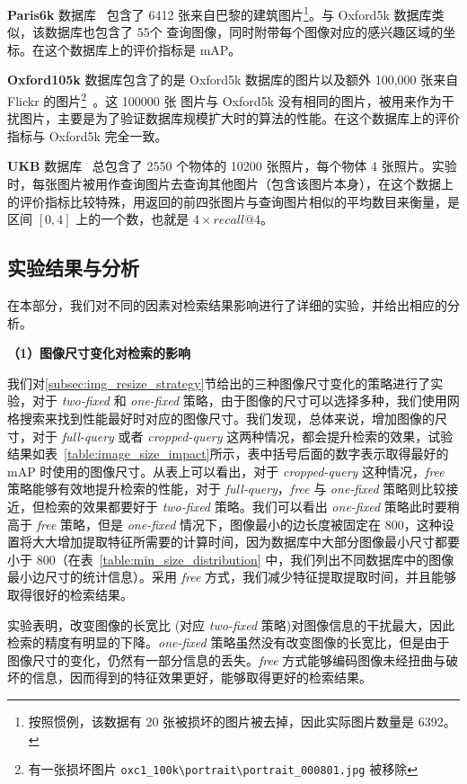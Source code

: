 \textbf{Paris6k} 数据库~\cite{Philbin2008LostIQ} 包含了 6412 张来自巴黎的建筑图片\footnote{按照惯例，该数据有 20 张被损坏的图片被去掉，因此实际图片数量是 6392。}。与 Oxford5k 数据库类似，该数据库也包含了 55个 查询图像，同时附带每个图像对应的感兴趣区域的坐标。在这个数据库上的评价指标是 mAP。

\textbf{Oxford105k} 数据库包含了的是 Oxford5k 数据库的图片以及额外 100,000 张来自 Flickr 的图片\footnote{有一张损坏图片 \verb+oxc1_100k\portrait\portrait_000801.jpg+ 被移除}~\cite{Philbin2007ObjectRW}。这 100000 张
图片与 Oxford5k 没有相同的图片，被用来作为干扰图片，主要是为了验证数据库规模扩大时的算法的性能。在这个数据库上的评价指标与 Oxford5k 完全一致。

\textbf{UKB} 数据库~\cite{Nistr2006ScalableRW} 总包含了 2550 个物体的 10200 张照片，每个物体 4 张照片。实验时，每张图片被用作查询图片去查询其他图片（包含该图片本身），在这个数据上的评价指标比较特殊，用返回的前四张图片与查询图片相似的平均数目来衡量，是区间 $[0,4]$ 上的一个数，也就是 $4\times recall@4$。

\subsection{实验结果与分析}
在本部分，我们对不同的因素对检索结果影响进行了详细的实验，并给出相应的分析。


\noindent\textbf{（1）图像尺寸变化对检索的影响}

我们对\ref{subsec:img_resize_strategy}节给出的三种图像尺寸变化的策略进行了实验，对于 \emph{two-fixed} 和
\emph{one-fixed} 策略，由于图像的尺寸可以选择多种，我们使用网格搜索来找到性能最好时对应的图像尺寸。我们发现，总体来说，增加图像的尺寸，对于 \emph{full-query} 或者 \emph{cropped-query} 这两种情况，都会提升检索的效果，试验结果如表~\ref{table:image_size_impact}所示，表中括号后面的数字表示取得最好的 mAP 时使用的图像尺寸。从表上可以看出，对于 \emph{cropped-query} 这种情况，\emph{free} 策略能够有效地提升检索的性能，对于 \emph{full-query}，\emph{free} 与 \emph{one-fixed} 策略则比较接近，但检索的效果都要好于 \emph{two-fixed} 策略。我们可以看出 \emph{one-fixed} 策略此时要稍高于 \emph{free} 策略，但是 \emph{one-fixed} 情况下，图像最小的边长度被固定在 800，这种设置将大大增加提取特征所需要的计算时间，因为数据库中大部分图像最小尺寸都要小于 800（在表~\ref{table:min_size_distribution} 中，我们列出不同数据库中的图像最小边尺寸的统计信息）。采用 \emph{free} 方式，我们减少特征提取提取时间，并且能够取得很好的检索结果。

实验表明，改变图像的长宽比 (对应 \emph{two-fixed} 策略)对图像信息的干扰最大，因此检索的精度有明显的下降。\emph{one-fixed} 策略虽然没有改变图像的长宽比，但是由于图像尺寸的变化，仍然有一部分信息的丢失。\emph{free} 方式能够编码图像未经扭曲与破坏的信息，因而得到的特征效果更好，能够取得更好的检索结果。

